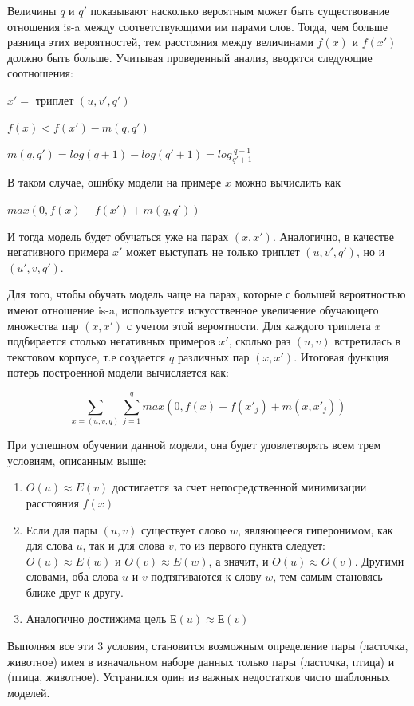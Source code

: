 Величины $q$ и $q'$ показывают насколько вероятным может быть существование
отношения is-a между соответствующими им парами слов. Тогда, чем больше
разница этих вероятностей, тем расстояния между величинами $f(x)$ и $f(x')$ должно
быть больше. Учитывая проведенный анализ, вводятся следующие соотношения:

$x' =$ триплет $(u, v', q')$

$f(x) < f(x') - m(q, q')$

$m(q, q') = log(q + 1) - log(q' + 1) = log \frac{q + 1}{q' + 1}$

В таком случае, ошибку модели на примере $x$ можно вычислить как

$max(0, f(x) - f(x') + m(q, q') )$

И тогда модель будет обучаться уже на парах $(x, x')$.
Аналогично, в качестве негативного примера $x'$ может выступать не только триплет
$(u, v', q')$, но и $(u', v, q')$.

Для того, чтобы обучать модель чаще на парах, которые с большей вероятностью
имеют отношение is-a, используется искусственное увеличение обучающего
множества пар $(x, x')$ с учетом этой вероятности. Для каждого триплета $x$
подбирается столько негативных примеров $x'$, сколько раз $(u, v)$ встретилась в
текстовом корпусе, т.е создается $q$ различных пар $(x, x')$.
Итоговая функция потерь построенной модели вычисляется как:

$$\sum_{x = (u, v, q)} \sum_{j = 1}^{q} max(0, f(x) - f(x'_j) + m(x, x'_j))$$

При успешном обучении данной модели, она будет удовлетворять всем трем
условиям, описанным выше:

\begin{enumerate}
\item $O(u) \approx E(v)$ достигается за счет непосредственной минимизации расстояния $f(x)$
\item Если для пары $(u, v)$ существует слово $w$, являющееся гиперонимом, как для
слова $u$, так и для слова $v$, то из первого пункта следует: $O(u) \approx E(w)$ и $O(v) \approx E(w)$, а значит, и $O(u) \approx O(v)$. Другими словами, оба слова $u$ и $v$ подтягиваются к
слову $w$, тем самым становясь ближе друг к другу.
\item Аналогично достижима цель $Е(u) \approx Е(v)$
\end{enumerate}

Выполняя все эти 3 условия, становится возможным определение пары (ласточка,
животное) имея в изначальном наборе данных только пары (ласточка, птица) и
(птица, животное). Устранился один из важных недостатков чисто шаблонных
моделей.

